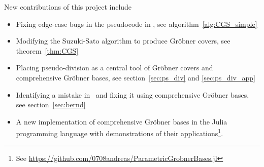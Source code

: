 New contributions of this project include
\begin{itemize}
  \item Fixing edge-case bugs in the pseudocode in \cite{ss_algo}, see algorithm~\ref{alg:CGS_simple}
  \item Modifying the Suzuki-Sato algorithm to produce Gröbner covers, see theorem~\ref{thm:CGS}
  \item Placing pseudo-division as a central tool of Gröbner covers and comprehensive Gröbner bases, see section~\ref{sec:ps_div} and \ref{sec:ps_div_app}
  \item Identifying a mistake in~\cite{sturmfels} and fixing it using comprehensive Gröbner bases, see section~\ref{sec:bernd}
  \item A new implementation of comprehensive Gröbner bases in the Julia programming language with demonstrations of their applications\footnote{See \url{https://github.com/0708andreas/ParametricGrobnerBases.jl}}.
\end{itemize}
